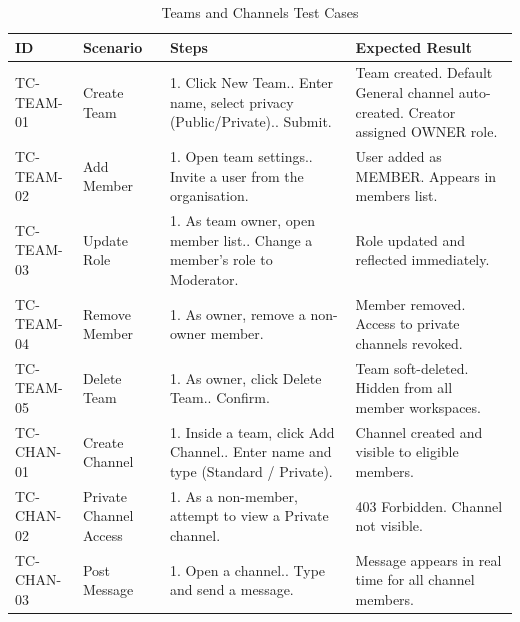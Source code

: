 \documentclass[11pt,a4paper]{report}
\begin{document}
\begin{xltabular}{\textwidth}{|L{2.5cm}|L{2.5cm}|X|L{3.5cm}|}
\caption{Teams and Channels Test Cases} \\
\hline
{} \textbf{ID} & \textbf{Scenario} & \textbf{Steps} & \textbf{Expected Result} \\ \hline
\endhead

TC-TEAM-01 & Create Team &
1. Click New Team.. Enter name, select privacy (Public/Private).. Submit. &
Team created. Default General channel auto-created. Creator assigned OWNER role. \\ \hline

TC-TEAM-02 & Add Member &
1. Open team settings.. Invite a user from the organisation. &
User added as MEMBER. Appears in members list. \\ \hline

TC-TEAM-03 & Update Role &
1. As team owner, open member list.. Change a member's role to Moderator. &
Role updated and reflected immediately. \\ \hline

TC-TEAM-04 & Remove Member &
1. As owner, remove a non-owner member. &
Member removed. Access to private channels revoked. \\ \hline

TC-TEAM-05 & Delete Team &
1. As owner, click Delete Team.. Confirm. &
Team soft-deleted. Hidden from all member workspaces. \\ \hline

TC-CHAN-01 & Create Channel &
1. Inside a team, click Add Channel.. Enter name and type (Standard / Private). &
Channel created and visible to eligible members. \\ \hline

TC-CHAN-02 & Private Channel Access &
1. As a non-member, attempt to view a Private channel. &
403 Forbidden. Channel not visible. \\ \hline

TC-CHAN-03 & Post Message &
1. Open a channel.. Type and send a message. &
Message appears in real time for all channel members. \\ \hline
\end{xltabular}
\end{document}
